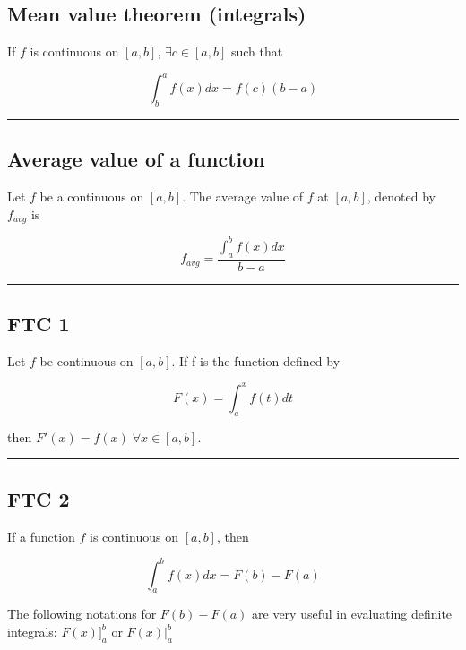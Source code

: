\documentclass[
  landscape,  
  10pt,
]{article}
\begin{document}
\begin{multicols}{3}
{\subsection{Mean value theorem
(integrals)}\label{mean-value-theorem-integrals}}

If \(f\) is continuous on \([a,b]\), \(\exists c \in [a,b]\) such that

\[ \int_b^a f(x)dx = f(c)(b-a) \]

\begin{center}\rule{0.5\linewidth}{0.5pt}\end{center}

\hypertarget{average-value-of-a-function}{%
\subsection{Average value of a
function}\label{average-value-of-a-function}}

Let \(f\) be a continuous on \([a,b]\). The average value of \(f\) at
\([a,b]\), denoted by \(f_{avg}\) is

\[ f_{avg} =  \frac{\int_a^b f(x)dx}{b-a}  \]

\begin{center}\rule{0.5\linewidth}{0.5pt}\end{center}

\hypertarget{ftc-1}{%
\subsection{FTC 1}\label{ftc-1}}

Let \(f\) be continuous on \([a,b]\). If f is the function defined by

\[ F(x) = \int_a^x f(t)dt \]

then \(F'(x) = f(x) \;\forall x \in [a,b]\).

\begin{center}\rule{0.5\linewidth}{0.5pt}\end{center}

\hypertarget{ftc-2}{%
\subsection{FTC 2}\label{ftc-2}}

If a function \(f\) is continuous on \([a,b]\), then

\[ \int_a^b f(x)dx = F(b)-F(a) \]

The following notations for \(F(b)-F(a)\) are very useful in evaluating
definite integrals: \(\displaystyle F(x)\Big]_a^b\) or
\(\displaystyle F(x)\Big|_a^b\)


\end{multicols}
\end{document}
